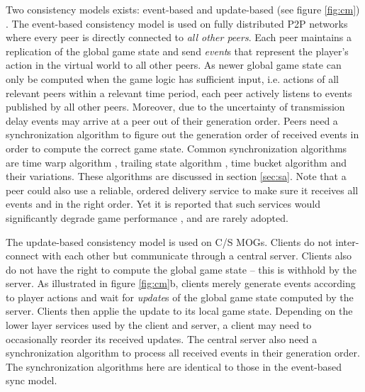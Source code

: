 \documentclass{article}
\begin{document}
Two consistency models exists: event-based and update-based (see figure \ref{fig:cm}) \cite{Gilmore12}. The event-based consistency model is used on fully distributed P2P networks where every peer is directly connected to \emph{all other peers}. Each peer maintains a replication of the global game state and send \emph{event}s that represent the player's action in the virtual world to all other peers. As newer global game state can only be computed when the game logic has sufficient input, i.e. actions of all relevant peers within a relevant time period, each peer actively listens to events published by all other peers. Moreover, due to the uncertainty of transmission delay events may arrive at a peer out of their generation order. Peers need a synchronization algorithm to figure out the generation order of received events in order to compute the correct game state. Common synchronization algorithms are time warp algorithm \cite{Fujimoto99}, trailing state algorithm \cite{Cronin04}, time bucket algorithm \cite{Gautier98, Diot99} and their variations. These algorithms are discussed in section \ref{sec:sa}.
Note that a peer could also use a reliable, ordered delivery service to make sure it receives all events and in the right order. Yet it is reported that such services would significantly degrade game performance \cite{Fgame}, and are rarely adopted. %

The update-based consistency model is used on C/S MOGs. Clients do not inter-connect with each other but communicate through a central server. Clients also do not have the right to compute the global game state -- this is withhold by the server. As illustrated in figure \ref{fig:cm}b, clients merely generate events according to player actions and wait for \emph{update}s of the global game state computed by the server. Clients then applie the update to its local game state. Depending on the lower layer services used by the client and server, a client may need to occasionally reorder its received updates. The central server also need a synchronization algorithm to process all received events in their generation order. The synchronization algorithms here are identical to those in the event-based sync model.
\end{document}
